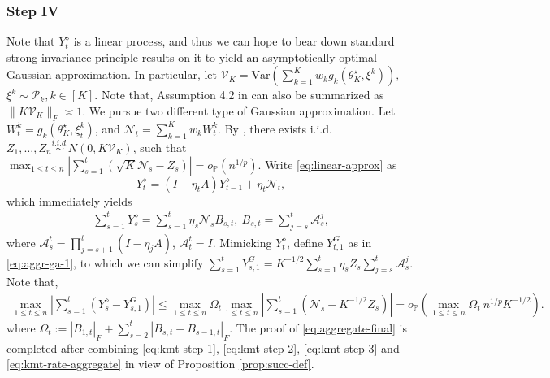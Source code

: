 \documentclass[a4paper,11pt]{article}
\numberwithin{equation}{section}
\theoremstyle{plain}
\theoremstyle{remark}
\newcommand{\Vcal}{\mathcal{V}}
\newcommand{\minparam}{\theta^\star_K}
\newcommand{\IP}{\mathbb{P}}
\newcommand{\var}{\mathrm{Var}}
\begin{document}
\subsubsection{Step IV}
Note that $Y_t^\diamond$ is a linear process, and thus we can hope to bear down standard strong invariance principle results \cite{komios1975approximation, Sakhanenko2006, gotzezaitsev} on it to yield an asymptotically optimal Gaussian approximation. In particular, let $\Vcal_K=\var(\sum_{k=1}^K w_k g_k(\minparam, \xi^k) ),$ $\xi^k \sim \mathcal{P}_k, k \in [K]$. Note that, Assumption 4.2 in \cite{songxichen2024} can also be summarized as $\|K \Vcal_K\|_F \asymp 1$. We pursue two different type of Gaussian approximation. Let $W_t^k= g_k(\minparam, \xi_t^k)$, and $\mathcal{N}_t=\sum_{k=1}^K w_k W_t^k$. By \cite{gotzezaitsev}, there exists i.i.d. $Z_1,\ldots, Z_n \overset{i.i.d.}{\sim} N(0, K\mathcal{V}_K)$, such that $\max_{1\leq t \leq n}|\sum_{s=1}^t(\sqrt{K}\mathcal{N}_s- Z_s)|=o_{\IP}(n^{1/p}).$ Write \eqref{eq:linear-approx} as 
\[ Y_t^\diamond = (I-\eta_t A)Y_{t-1}^\diamond + \eta_t \mathcal{N}_t, \]
which immediately yields 
\begin{align} \label{eq:sum-Y-diamond}
   \sum_{s=1}^t Y_s^{\diamond}=\sum_{s=1}^t \eta_s \mathcal{N}_s B_{s,t}, \ B_{s,t}= \sum_{j=s}^t\mathcal{A}_s^j,
\end{align}
where $\mathcal{A}_s^t=\prod_{j=s+1}^t (I-\eta_j A)$, $\mathcal{A}_t^t=I$. Mimicking $Y_t^{\diamond}$, define $Y_{t,1}^G$ as in \eqref{eq:aggr-ga-1}, to which we can simplify $\sum_{s=1}^t Y_{s,1}^{G}= K^{-1/2}\sum_{s=1}^t \eta_s Z_s \sum_{j=s}^t\mathcal{A}_s^j$. Note that,
\begin{align} \label{eq:kmt-rate-aggregate}
    \max_{1\leq t \leq n}|\sum_{s=1}^t (Y_s^\diamond - Y_{s,1}^{G})| \leq \max_{1\leq t\leq n}\Omega_t \max_{1\leq t \leq n}|\sum_{s=1}^t(\mathcal{N}_s - K^{-1/2}Z_s)|=o_{\IP}(\max_{1\leq t\leq n}\Omega_t \ n^{1/p}K^{-1/2}).
\end{align}
where $\Omega_t := |B_{1,t}|_F + \sum_{s=2}^t|B_{s,t} - B_{s-1, t}|_F$. The proof of \eqref{eq:aggregate-final} is completed after combining \eqref{eq:kmt-step-1}, \eqref{eq:kmt-step-2}, \eqref{eq:kmt-step-3} and \eqref{eq:kmt-rate-aggregate} in view of Proposition \ref{prop:succ-def}.
\end{document}
